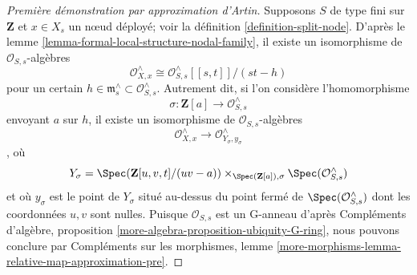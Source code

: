 \begin{proof}[Première démonstration par approximation d'Artin]
\medskip\noindent
Supposons $S$ de type fini sur $\mathbf{Z}$ et $x \in X_s$ un nœud déployé; voir la définition \ref{definition-split-node}. D'après le lemme \ref{lemma-formal-local-structure-nodal-family}, il existe un isomorphisme de $\mathcal{O}_{S, s}$-algèbres $$
\mathcal{O}_{X, x}^\wedge \cong
\mathcal{O}_{S, s}^\wedge[[s, t]]/(st - h)
$$ pour un certain $h \in \mathfrak m_s^\wedge \subset \mathcal{O}_{S, s}^\wedge$. Autrement dit, si l'on considère l'homomorphisme $$
\sigma : \mathbf{Z}[a] \longrightarrow \mathcal{O}_{S, s}^\wedge
$$ envoyant $a$ sur $h$, il existe un isomorphisme de $\mathcal{O}_{S, s}$-algèbres $$
\mathcal{O}_{X, x}^\wedge
\longrightarrow
\mathcal{O}_{Y_\sigma, y_\sigma}^\wedge
$$, où $$
Y_\sigma = \Spec(\mathbf{Z}[u, v, t]/(uv - a))
\times_{\Spec(\mathbf{Z}[a]), \sigma} \Spec(\mathcal{O}_{S, s}^\wedge)
$$ et où $y_\sigma$ est le point de $Y_\sigma$ situé au-dessus du point fermé de $\Spec(\mathcal{O}_{S, s}^\wedge)$ dont les coordonnées $u, v$ sont nulles. Puisque $\mathcal{O}_{S, s}$ est un G-anneau d'après Compléments d'algèbre, proposition \ref{more-algebra-proposition-ubiquity-G-ring}, nous pouvons conclure par Compléments sur les morphismes, lemme \ref{more-morphisms-lemma-relative-map-approximation-pre}.
\end{proof}
\endgroup

